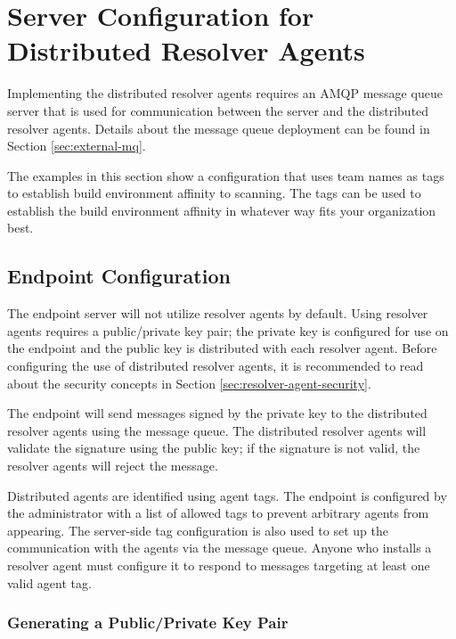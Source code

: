 \section{Server Configuration for Distributed Resolver Agents}\label{sec:resolver-server}

Implementing the distributed resolver agents requires an AMQP message queue server that
is used for communication between the \cxoneflow server and the distributed resolver
agents.  Details about the message queue deployment can be found in Section \ref{sec:external-mq}.

The examples in this section show a configuration that uses team names as tags to establish
build environment affinity to \scaresolver scanning.  The tags can be used to establish
the build environment affinity in whatever way fits your organization best.

\subsection{\cxoneflowtext\space Endpoint Configuration}

The endpoint server  will not utilize resolver agents
by default.  Using resolver agents requires a public/private key pair; the private key is configured
for use on the \cxoneflow endpoint and the public key is distributed with each resolver agent.  Before
configuring the use of distributed resolver agents, it is recommended to read about the security
concepts in Section \ref{sec:resolver-agent-security}.

The \cxoneflow endpoint will send messages signed by the private key to the distributed resolver
agents using the message queue.  The distributed resolver agents will validate the signature
using the public key; if the signature is not valid, the resolver agents will reject the message.

Distributed agents are identified using agent tags.  The \cxoneflow endpoint is configured by the
administrator with a list of allowed tags to prevent arbitrary agents from appearing.  The
server-side tag configuration is also used to set up the communication with the agents via
the message queue.  Anyone who installs a resolver agent must configure it to respond to messages
targeting at least one valid agent tag.


\subsubsection{Generating a Public/Private Key Pair}\label{ref:server-key-pair}

